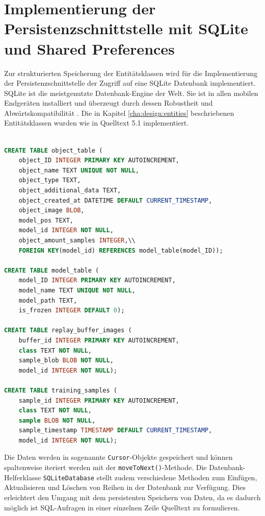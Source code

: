 \documentclass[oneside]{ausarbeitung}
\begin{document}
\section{Implementierung der Persistenzschnittstelle mit SQLite und Shared Preferences}
Zur strukturierten Speicherung der Entitätsklassen wird für die Implementierung der Persistenzschnittstelle der Zugriff auf eine SQLite Datenbank implementiert. SQLite ist die meistgenutzte Datenbank-Engine der Welt. Sie ist in allen mobilen Endgeräten installiert und überzeugt durch dessen Robustheit und Abwärtskompatibilität \cite{sqlite-documentation}. Die in Kapitel \ref{cha:design:entities} beschriebenen Entitätsklassen wurden wie in Quelltext 5.1 implementiert.\\ \\
\begin{minipage}{\linewidth}
\begin{lstlisting}[language=SQL, breaklines=true, caption={SQLite Statements zum Erstellen der Tabellen}]
CREATE TABLE object_table (
	object_ID INTEGER PRIMARY KEY AUTOINCREMENT,
	object_name TEXT UNIQUE NOT NULL,
	object_type TEXT,
	object_additional_data TEXT,
	object_created_at DATETIME DEFAULT CURRENT_TIMESTAMP,
	object_image BLOB,
	model_pos TEXT,
	model_id INTEGER NOT NULL,
	object_amount_samples INTEGER,\\
	FOREIGN KEY(model_id) REFERENCES model_table(model_ID));

CREATE TABLE model_table (
	model_ID INTEGER PRIMARY KEY AUTOINCREMENT,
	model_name TEXT UNIQUE NOT NULL,
	model_path TEXT,
	is_frozen INTEGER DEFAULT 0);

CREATE TABLE replay_buffer_images (
	buffer_id INTEGER PRIMARY KEY AUTOINCREMENT,
	class TEXT NOT NULL, 
	sample_blob BLOB NOT NULL,
	model_id INTEGER NOT NULL);
	
CREATE TABLE training_samples (
	sample_id INTEGER PRIMARY KEY AUTOINCREMENT,
	class TEXT NOT NULL,
	sample BLOB NOT NULL,
	sample_timestamp TIMESTAMP DEFAULT CURRENT_TIMESTAMP,
	model_id INTEGER NOT NULL);
\end{lstlisting}
\label{lst:sql-statements}
\end{minipage}
Die Daten werden in sogenannte \texttt{Cursor}-Objekte gespeichert und können spaltenweise iteriert werden mit der \texttt{moveToNext()}-Methode. Die Datenbank-Helferklasse \texttt{SQLiteDatabase} stellt zudem verschiedene Methoden zum Einfügen, Aktualisieren und Löschen von Reihen in der Datenbank zur Verfügung. Dies erleichtert den Umgang mit dem persistenten Speichern von Daten, da es dadurch möglich ist SQL-Anfragen in einer einzelnen Zeile Quelltext zu formulieren.\\
\end{document}
